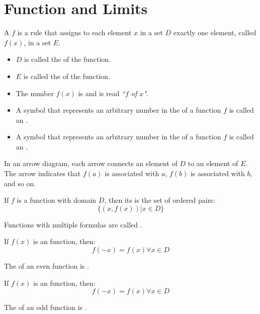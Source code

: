 \chapter{Function and Limits}
    \par A  $f$ is a rule that assigns to each element $x$ in
    a set $D$ exactly one element, called $f(x)$, in a set $E$.

        \begin{itemize}
            \item $D$ is called the  of the function.
            \item $E$ is called the  of the function.
            \item The number $f(x)$ is  and is
                read \textit{``$f$ of $x$"}.
            \item A symbol that represents an arbitrary number in the 
                of a function $f$ is called an .
            \item A symbol that represents an arbitrary number in the 
                of a function $f$ is called an .
       \end{itemize}
        
            \par In an arrow diagram, each arrow connects an element of $D$ to an
            element of $E$. The arrow indicates that $f(a)$ is associated with $a$,
            $f(b)$ is associated with $b$, and so on.
            \par If $f$ is a function with domain $D$, then its  is the set of
            ordered pairs:
            \begin{equation}
                \{(x, f(x)) | x \in D\}
            \end{equation}
    \hiiEND
        
        \par Functions with multiple formulas are called .

            \par If $f(x)$ is an  function, then:
            \begin{equation}
                f(-x) = f(x) \forall x \in D
            \end{equation}
            \par The  of an even function is .
            \par If $f(x)$ is an  function, then:
            \begin{equation}
                f(-x) = f(x) \forall x \in D
            \end{equation}
            \par The  of an odd function is .
    \hiiEND

